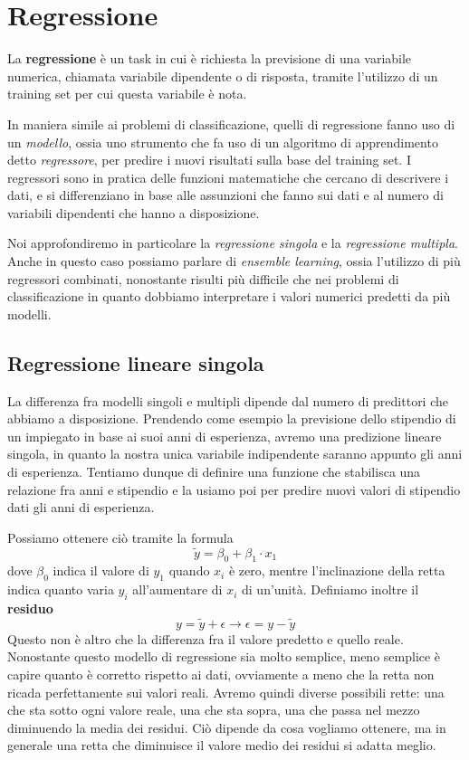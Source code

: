 \section{Regressione}
    La \textbf{regressione} è un task in cui è richiesta la previsione di una variabile numerica, chiamata variabile dipendente o di risposta, tramite l'utilizzo di un training set per cui questa variabile è nota.
    
    In maniera simile ai problemi di classificazione, quelli di regressione fanno uso di un \textit{modello}, ossia uno strumento che fa uso di un algoritmo di apprendimento detto \textit{regressore}, per predire i nuovi risultati sulla base del training set. I regressori sono in pratica delle funzioni matematiche che cercano di descrivere i dati, e si differenziano in base alle assunzioni che fanno sui dati e al numero di variabili dipendenti che hanno a disposizione.
    
    Noi approfondiremo in particolare la \textit{regressione singola} e la \textit{regressione multipla}. Anche in questo caso possiamo parlare di \textit{ensemble learning}, ossia l'utilizzo di più regressori combinati, nonostante risulti più difficile che nei problemi di classificazione in quanto dobbiamo interpretare i valori numerici predetti da più modelli.
    
    \subsection{Regressione lineare singola}
        La differenza fra modelli singoli e multipli dipende dal numero di predittori che abbiamo a disposizione. Prendendo come esempio la previsione dello stipendio di un impiegato in base ai suoi anni di esperienza, avremo una predizione lineare singola, in quanto la nostra unica variabile indipendente saranno appunto gli anni di esperienza. Tentiamo dunque di definire una funzione che stabilisca una relazione fra anni e stipendio e la usiamo poi per predire nuovi valori di stipendio dati gli anni di esperienza.
        
        Possiamo ottenere ciò tramite la formula
        \begin{equation*}
            \tilde{y} = \beta_0 + \beta_1 \cdot x_1
        \end{equation*}
        dove $\beta_0$ indica il valore di $y_1$ quando $x_i$ è zero, mentre l'inclinazione della retta indica quanto varia $y_i$ all'aumentare di $x_i$ di un'unità. Definiamo inoltre il \textbf{residuo}
        \begin{equation*}
            y = \tilde{y} + \epsilon \longrightarrow \epsilon = y - \tilde{y}
        \end{equation*}
        Questo non è altro che la differenza fra il valore predetto e quello reale. Nonostante questo modello di regressione sia molto semplice, meno semplice è capire quanto è corretto rispetto ai dati, ovviamente a meno che la retta non ricada perfettamente sui valori reali. Avremo quindi diverse possibili rette: una che sta sotto ogni valore reale, una che sta sopra, una che passa nel mezzo diminuendo la media dei residui. Ciò dipende da cosa vogliamo ottenere, ma in generale una retta che diminuisce il valore medio dei residui si adatta meglio.
        
